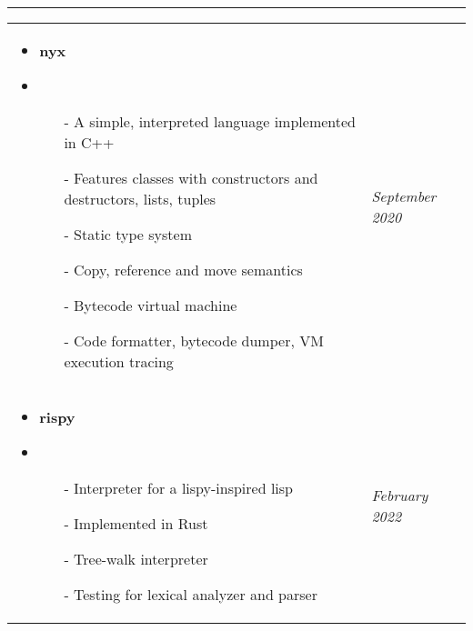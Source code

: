 \documentclass[12pt]{article}
\newcommand{\primarycolor}{red}
\newcommand{\mysection}[1]{{\large\color{\primarycolor}{#1}}}
\newcommand{\myhspace}[1]{\hspace*{\fill}{#1}}
\begin{document}
    \clearpage
    \vspace{1ex}
    \hrule
    \vspace{2ex}
    \noindent\mysection{Projects}

    \vspace{2ex}
    {\renewcommand{\arraystretch}{1.4}
    \begin{tabularx}{\textwidth}{>{\raggedright\arraybackslash}p{}|l}
        \begin{itemize}[nosep,parsep=1ex,itemsep=0.8ex,leftmargin=0.1ex]
            \item\vspace{-1.6ex}\textbf{nyx}\myhspace{\url{https://github.com/dc03/nyx}}
            \item\begin{itemize}[itemsep=0.5ex, leftmargin=3.5ex]
                \item[-] A simple, interpreted language implemented in C++
                \item[-] Features classes with constructors and destructors, lists, tuples
                \item[-] Static type system
                \item[-] Copy, reference and move semantics
                \item[-] Bytecode virtual machine
                \item[-] Code formatter, bytecode dumper, VM execution tracing
            \end{itemize}
        \end{itemize} &
        \textit{September 2020} \\

        \begin{itemize}[nosep,parsep=1ex,itemsep=0.8ex,leftmargin=0.1ex]
            \item\vspace{-1.6ex}\textbf{rispy}\myhspace{\url{https://github.com/dc03/rispy}}
            \item\begin{itemize}[itemsep=0.5ex, leftmargin=3.5ex]
                \item[-] Interpreter for a lispy-inspired lisp
                \item[-] Implemented in Rust
                \item[-] Tree-walk interpreter
                \item[-] Testing for lexical analyzer and parser
            \end{itemize}
        \end{itemize} &
        \textit{February 2022} \\


\end{tabularx}}
\end{document}

